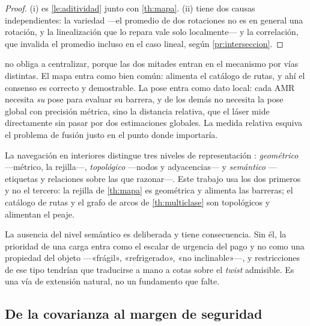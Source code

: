 \begin{proof}
(i) es \cref{le:aditividad} junto con \cref{th:mapa}. (ii) tiene dos causas
independientes: la variedad —el promedio de dos rotaciones no es en general una
rotación, y la linealización que lo repara vale solo localmente— y la
correlación, que invalida el promedio incluso en el caso lineal, según
\cref{pr:interseccion}.
\end{proof}

\begin{observacion}
\label{obs:asimetria-consecuencia}
 no obliga a centralizar, porque las dos mitades entran en el
mecanismo por vías distintas. El mapa entra como bien común: alimenta el
catálogo de rutas, y ahí el consenso es correcto y demostrable. La pose entra
como dato local: cada AMR necesita \emph{su} pose para evaluar su barrera, y de
los demás no necesita la pose global con precisión métrica, sino la distancia
relativa, que el láser mide directamente sin pasar por dos estimaciones
globales. La medida relativa esquiva el problema de fusión justo en el punto
donde importaría.
\end{observacion}

\begin{observacion}
\label{obs:jerarquia-mapas}
La navegación en interiores distingue tres niveles de representación
\cite{gorrostieta2019applications}: \emph{geométrico} —métrico, la rejilla—,
\emph{topológico} —nodos y adyacencias— y \emph{semántico} —etiquetas y
relaciones sobre las que razonar—. Este trabajo usa los dos primeros y no el
tercero: la rejilla de \cref{th:mapa} es geométrica y alimenta las barreras;
el catálogo de rutas y el grafo de arcos de \cref{th:multiclase} son
topológicos y alimentan el peaje.

La ausencia del nivel semántico es deliberada y tiene consecuencia. Sin él, la
prioridad de una carga entra como el escalar de urgencia del pago y no como una
propiedad del objeto —«frágil», «refrigerado», «no inclinable»—, y restricciones
de ese tipo tendrían que traducirse a mano a cotas sobre el \emph{twist}
admisible. Es una vía de extensión natural, no un fundamento que falte.
\end{observacion}

\subsection{De la covarianza al margen de seguridad}

